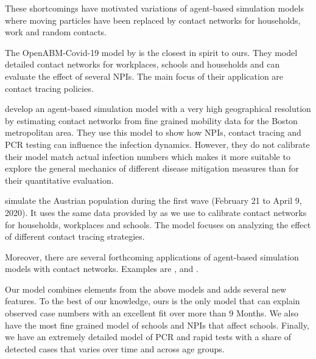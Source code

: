 These shortcomings have motivated variations of agent-based simulation models where
moving particles have been replaced by contact networks for households, work and random
contacts.

The OpenABM-Covid-19 model by \citet{Hinch2020} is the closest in spirit to
ours. They model detailed
contact networks for workplaces, schools and households and can evaluate the effect of
several NPIs. The main focus of their application are contact tracing policies.

\citet{Aleta2020} develop an agent-based simulation model with a very high geographical
resolution by estimating contact networks from fine grained mobility data for the
Boston metropolitan area. They use this model to show how NPIs, contact tracing and PCR
testing can influence the infection dynamics. However, they do not calibrate their model
match actual infection numbers which makes it more suitable to explore the general
mechanics of different disease mitigation measures than for their quantitative
evaluation.

\citet{Bicher2021} simulate the Austrian population during the first wave (February 21
to April 9, 2020). It uses the same data provided by \citet{Mossong2008} as we use to
calibrate contact networks for households, workplaces and schools. The model focuses on
analyzing the effect of different contact tracing strategies.

Moreover, there are several forthcoming applications of agent-based simulation models with contact networks. Examples are
\citet{Basurto2020}, \citet{DelliGatti2020} and \citet{Mellacher2020}.

Our model combines elements from the above models and adds several new features. To
the best of our knowledge, ours is the only model that can explain observed case
numbers with an excellent fit over more than 9 Months. We also have the most fine
grained model of schools and NPIs that affect schools. Finally, we have an extremely
detailed model of PCR and rapid tests with a share of detected cases that varies over
time and across age groups.


